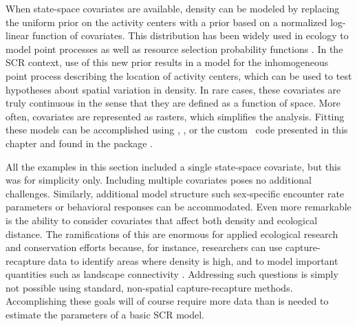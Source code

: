 When state-space covariates are available,
density can be modeled by replacing the uniform prior on the activity
centers with a
prior based on a normalized log-linear function of covariates. This
distribution has been widely used in ecology to model point processes
as well as resource selection probability functions
\citep{manly_etal:2002,lele_keim:2006}. In the SCR
context, use of this new prior results in
a model for the inhomogeneous point process describing the
location of activity centers, which can be used to test hypotheses
about spatial variation in density. In
rare cases, these covariates are truly continuous in the sense that
they are defined as a function of space. More often, covariates are
represented as rasters, which simplifies the analysis. Fitting these
models can be accomplished using \bugs, \secr, or the custom \R~code
presented in this chapter and found in the package \scrbook.

All the examples in this section included a single state-space
covariate, but this was for simplicity only. Including multiple
covariates poses no additional challenges. Similarly, additional model
structure such sex-specific encounter rate parameters or behavioral
responses can be accommodated. Even more remarkable is the ability to
consider covariates that affect both density and ecological
distance. The ramifications of this are enormous for applied
ecological research and conservation efforts because, for instance,
researchers can use capture-recapture data to identify areas where
density is high, and to model important quantities such as landscape
connectivity \citep{royle_etal:2012ecol}. Addressing such questions
is simply not possible using standard, non-spatial capture-recapture
methods. Accomplishing these goals will of course require more data
than is needed to estimate the parameters of a basic SCR model.

